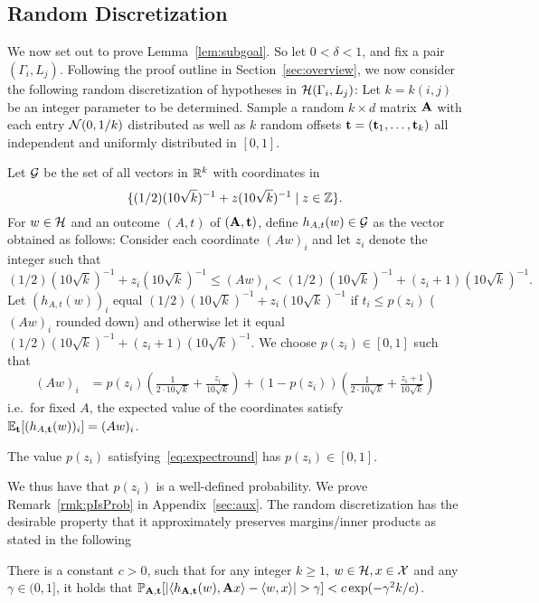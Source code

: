 \subsection{Random Discretization}
\label{sec:mainargs}
We now set out to prove Lemma~\ref{lem:subgoal}. So let $0 < \delta < 1$, and fix a pair $(\Gamma_i, L_j)$. Following the proof outline in Section~\ref{sec:overview}, we now consider the following random discretization of hypotheses in $\mathcal{H}(\Gamma_i, L_j)$: Let $k= k(i,j)$ be an integer parameter to be determined. Sample a random $k \times d$ matrix $\mathbf{A}$ with each entry $\mathcal{N}(0,1/k)$ distributed as well as $k$ random offsets $\mathbf{t} = (\mathbf{t}_1,\dots,\mathbf{t}_k)$ all independent and uniformly distributed in $[0,1]$.

Let $\mathcal{G}$ be the set of all vectors in $\mathbb{R}^k$ with coordinates in 
\[
\{(1/2)(10 \sqrt{k})^{-1} + z (10 \sqrt{k})^{-1}  \mid z \in \mathbb{Z}\}.
\]
For $w \in \mathcal{H}$ and an outcome $(A,t)$ of $(\mathbf{A},\mathbf{t})$, define $h_{A,t}(w) \in \mathcal{G}$ as the vector obtained as follows: Consider each coordinate $(Aw)_i$ and let $z_i$ denote the integer such that 
\[
(1/2)(10 \sqrt{k})^{-1}  + z_i (10 \sqrt{k})^{-1} \leq (Aw)_i < (1/2)(10 \sqrt{k})^{-1}  + (z_i+1) (10\sqrt{k})^{-1}.
\]
Let $(h_{A,t}(w))_i$ equal $(1/2)(10 \sqrt{k})^{-1} + z_i (10\sqrt{k})^{-1}$ if $t_i \leq p(z_i)$ ($(Aw)_i$ rounded down) and otherwise let it equal $(1/2)(10 \sqrt{k})^{-1}  + (z_i + 1)(10\sqrt{k})^{-1}$. We choose $p(z_i) \in [0,1]$ such that 
\begin{align}
(Aw)_i &= 
p(z_i)\left(\frac{1}{2 \cdot 10 \sqrt{k}} +\frac{z_i}{10\sqrt{k}}\right) + (1-p(z_i))\left(\frac{1}{2 \cdot 10 \sqrt{k}} +\frac{z_i+1}{10\sqrt{k}}\right) \label{eq:expectround}
\end{align}
i.e.\ for fixed $A$, the expected value of the coordinates satisfy $\mathbb{E}_{\mathbf{t}}[(h_{A,\mathbf{t}}(w))_i]=(Aw)_i$. 
\begin{remark}
\label{rmk:pIsProb}
The value $p(z_i)$ satisfying~\eqref{eq:expectround} has $p(z_i) \in [0,1]$.
\end{remark}
We thus have that $p(z_i)$ is a well-defined probability. We prove Remark~\ref{rmk:pIsProb} in Appendix~\ref{sec:aux}. The random discretization has the desirable property that it approximately preserves margins/inner products as stated in the following
\begin{lemma}
\label{lem:concdiscretize}
    There is a constant $c>0$, such that for any integer $k \geq 1$, $w \in \mathcal{H}, x \in \mathcal{X}$ and any $\gamma \in (0,1]$, it holds that 
    $
    \mathbb{P}_{\mathbf{A},\mathbf{t}}[|\langle h_{\mathbf{A},\mathbf{t}}(w),\mathbf{A} x\rangle - \langle w, x\rangle| > \gamma] < c\exp(-\gamma^2 k/c)
    $.
\end{lemma}
